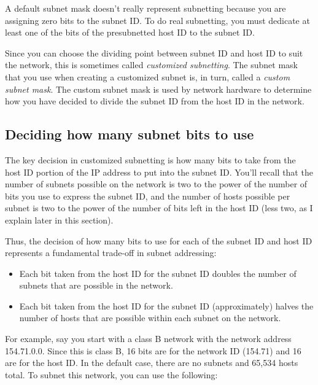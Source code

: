 A default subnet mask doesn't really represent subnetting because you
are assigning zero bits to the subnet ID. To do real subnetting, you
must dedicate at least one of the bits of the presubnetted host ID to
the subnet ID.

Since you can choose the dividing point between subnet ID and host ID to suit the network, this is sometimes called \emph{customized subnetting}.
The subnet mask that you use when creating a customized subnet is, in turn, called a \emph{custom subnet mask}.
The custom subnet mask is used by network hardware to determine how you have decided to divide the subnet ID from the host ID in the network.



\subsection{Deciding how many subnet bits to use}

The key decision in customized subnetting is how many bits to take from
the host ID portion of the IP address to put into the subnet ID.
You'll recall that the number of subnets
possible on the network is two to the power of the number of bits you
use to express the subnet ID, and the number of hosts possible per
subnet is two to the power of the number of bits left in the host ID
(less two, as I explain later in this section).

Thus, the decision of how many bits to use for each of the subnet ID and
host ID represents a fundamental trade-off in subnet addressing:

\begin{itemize}
\item
  Each bit taken from the host ID for the subnet ID doubles the number
  of subnets that are possible in the network.
\item
  Each bit taken from the host ID for the subnet ID (approximately)
  halves the number of hosts that are possible within each subnet on the
  network.
\end{itemize}

For example, say you start with a class B network with the network
address 154.71.0.0. Since this is class B, 16 bits are for the network
ID (154.71) and 16 are for the host ID. In the default case, there are
no subnets and 65,534 hosts total. To subnet this network, you can use
the following:

